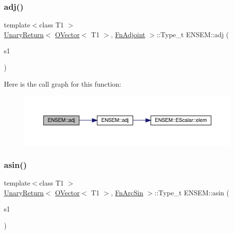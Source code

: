 \subsubsection{\texorpdfstring{adj()}{adj()}}
{\footnotesize\ttfamily template$<$class T1 $>$ \\
\mbox{\hyperlink{structENSEM_1_1UnaryReturn}{Unary\+Return}}$<$ \mbox{\hyperlink{classENSEM_1_1OVector}{O\+Vector}}$<$ T1 $>$, \mbox{\hyperlink{structENSEM_1_1FnAdjoint}{Fn\+Adjoint}} $>$\+::Type\+\_\+t E\+N\+S\+E\+M\+::adj (\begin{DoxyParamCaption}\item[{const \mbox{\hyperlink{classENSEM_1_1OVector}{O\+Vector}}$<$ T1 $>$ \&}]{s1 }\end{DoxyParamCaption})\hspace{0.3cm}{\ttfamily [inline]}}

Here is the call graph for this function\+:\nopagebreak
\begin{figure}[H]
\begin{center}
\leavevmode
\includegraphics[width=350pt]{da/d59/group__obsvector_gab801d265f143d9dca7ac1e3298640bf7_cgraph}
\end{center}
\end{figure}
\mbox{\label{group__obsvector_ga90cc9607dddfb6dc09c58de601982b10}} 
\subsubsection{\texorpdfstring{asin()}{asin()}}
{\footnotesize\ttfamily template$<$class T1 $>$ \\
\mbox{\hyperlink{structENSEM_1_1UnaryReturn}{Unary\+Return}}$<$ \mbox{\hyperlink{classENSEM_1_1OVector}{O\+Vector}}$<$ T1 $>$, \mbox{\hyperlink{structENSEM_1_1FnArcSin}{Fn\+Arc\+Sin}} $>$\+::Type\+\_\+t E\+N\+S\+E\+M\+::asin (\begin{DoxyParamCaption}\item[{const \mbox{\hyperlink{classENSEM_1_1OVector}{O\+Vector}}$<$ T1 $>$ \&}]{s1 }\end{DoxyParamCaption})\hspace{0.3cm}{\ttfamily [inline]}}

